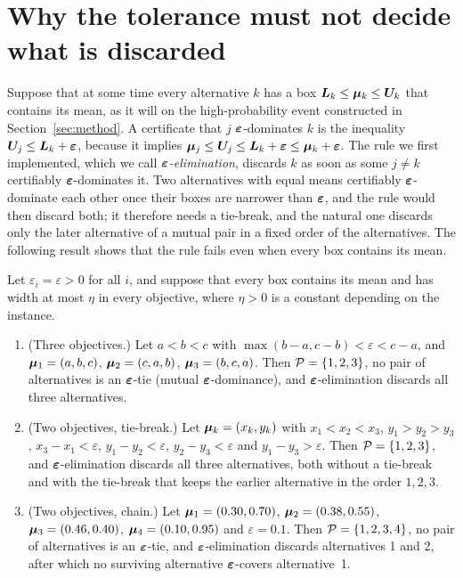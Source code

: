 \section{Why the tolerance must not decide what is discarded}\label{sec:failure}

Suppose that at some time every alternative $k$ has a box $\bm{L}_k\le\bm{\mu}_k\le\bm{U}_k$ that contains its mean, as it will on the high-probability event constructed in Section~\ref{sec:method}. A certificate that $j$ $\bm{\varepsilon}$-dominates $k$ is the inequality $\bm{U}_j\le\bm{L}_k+\bm{\varepsilon}$, because it implies $\bm{\mu}_j\le\bm{U}_j\le\bm{L}_k+\bm{\varepsilon}\le\bm{\mu}_k+\bm{\varepsilon}$. The rule we first implemented, which we call \emph{$\bm{\varepsilon}$-elimination}, discards $k$ as soon as some $j\ne k$ certifiably $\bm{\varepsilon}$-dominates it. Two alternatives with equal means certifiably $\bm{\varepsilon}$-dominate each other once their boxes are narrower than $\bm{\varepsilon}$, and the rule would then discard both; it therefore needs a tie-break, and the natural one discards only the later alternative of a mutual pair in a fixed order of the alternatives. The following result shows that the rule fails even when every box contains its mean.

\begin{proposition}\label{prop:failure}
Let $\varepsilon_i=\varepsilon>0$ for all $i$, and suppose that every box contains its mean and has width at most $\eta$ in every objective, where $\eta>0$ is a constant depending on the instance.
\begin{enumerate}[label=(\alph*),leftmargin=*,itemsep=0pt]
\item (Three objectives.) Let $a<b<c$ with $\max(b-a,c-b)<\varepsilon<c-a$, and $\bm{\mu}_1=(a,b,c)$, $\bm{\mu}_2=(c,a,b)$, $\bm{\mu}_3=(b,c,a)$. Then $\mathcal{P}=\{1,2,3\}$, no pair of alternatives is an $\bm{\varepsilon}$-tie (mutual $\bm{\varepsilon}$-dominance), and $\bm{\varepsilon}$-elimination discards all three alternatives.
\item (Two objectives, tie-break.) Let $\bm{\mu}_k=(x_k,y_k)$ with $x_1<x_2<x_3$, $y_1>y_2>y_3$, $x_3-x_1<\varepsilon$, $y_1-y_2<\varepsilon$, $y_2-y_3<\varepsilon$ and $y_1-y_3>\varepsilon$. Then $\mathcal{P}=\{1,2,3\}$, and $\bm{\varepsilon}$-elimination discards all three alternatives, both without a tie-break and with the tie-break that keeps the earlier alternative in the order $1,2,3$.
\item (Two objectives, chain.) Let $\bm{\mu}_1=(0.30,0.70)$, $\bm{\mu}_2=(0.38,0.55)$, $\bm{\mu}_3=(0.46,0.40)$, $\bm{\mu}_4=(0.10,0.95)$ and $\varepsilon=0.1$. Then $\mathcal{P}=\{1,2,3,4\}$, no pair of alternatives is an $\bm{\varepsilon}$-tie, and $\bm{\varepsilon}$-elimination discards alternatives 1 and 2, after which no surviving alternative $\bm{\varepsilon}$-covers alternative~1.
\end{enumerate}
\end{proposition}

